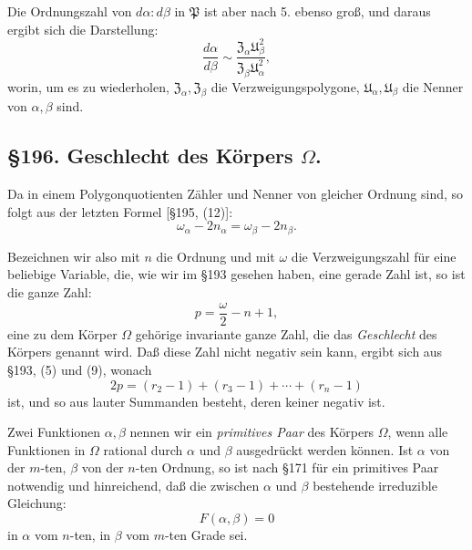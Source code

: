 \documentclass[12pt,a4paper]{article}
\begin{document}
Die Ordnungszahl von $d\alpha:d\beta$ in $\mathfrak{P}$ ist aber nach 5. ebenso groß, und daraus ergibt sich die Darstellung:
\begin{equation}\label{eq:195-13}
\frac{d\alpha}{d\beta} \sim \frac{\mathfrak{Z}_\alpha \mathfrak{U}_\beta^2}{\mathfrak{Z}_\beta \mathfrak{U}_\alpha^2},
\end{equation}
worin, um es zu wiederholen, $\mathfrak{Z}_\alpha, \mathfrak{Z}_\beta$ die Verzweigungspolygone, $\mathfrak{U}_\alpha, \mathfrak{U}_\beta$ die Nenner von $\alpha, \beta$ sind.

\subsection*{\S 196. Geschlecht des Körpers $\Omega$.}

Da in einem Polygonquotienten Zähler und Nenner von gleicher Ordnung sind, so folgt aus der letzten Formel [\S 195, (12)]:
\begin{equation}\label{eq:196-1}
\omega_\alpha - 2n_\alpha = \omega_\beta - 2n_\beta.
\end{equation}

Bezeichnen wir also mit $n$ die Ordnung und mit $\omega$ die Verzweigungszahl für eine beliebige Variable, die, wie wir im \S 193 gesehen haben, eine gerade Zahl ist, so ist die ganze Zahl:
\begin{equation}\label{eq:196-2}
p = \frac{\omega}{2} - n + 1,
\end{equation}
eine zu dem Körper $\Omega$ gehörige invariante ganze Zahl, die das \emph{Geschlecht} des Körpers genannt wird. Daß diese Zahl nicht negativ sein kann, ergibt sich aus \S 193, (5) und (9), wonach
\begin{equation}\label{eq:196-3}
2p = (r_2 - 1) + (r_3 - 1) + \cdots + (r_n - 1)
\end{equation}
ist, und so aus lauter Summanden besteht, deren keiner negativ ist.

Zwei Funktionen $\alpha, \beta$ nennen wir ein \emph{primitives Paar} des Körpers $\Omega$, wenn alle Funktionen in $\Omega$ rational durch $\alpha$ und $\beta$ ausgedrückt werden können. Ist $\alpha$ von der $m$-ten, $\beta$ von der $n$-ten Ordnung, so ist nach \S 171 für ein primitives Paar notwendig und hinreichend, daß die zwischen $\alpha$ und $\beta$ bestehende irreduzible Gleichung:
\begin{equation}\label{eq:196-4}
F(\alpha, \beta) = 0
\end{equation}
in $\alpha$ vom $n$-ten, in $\beta$ vom $m$-ten Grade sei.
\end{document}
